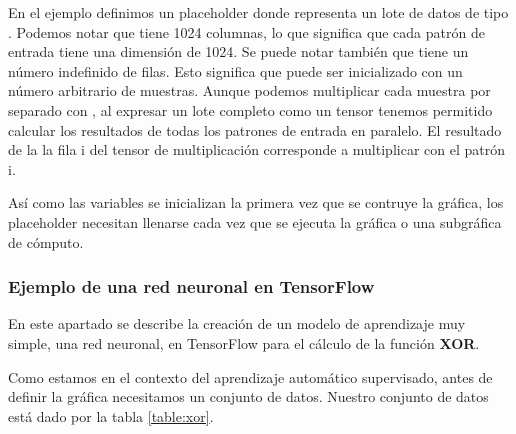 \begin{sphinxVerbatim}[commandchars=\\\{\}]
    \PYG{p}{[} \PYG{p}{]}
  \PYG{p}{[}\PYG{p}{]}   
   
\end{sphinxVerbatim}

En el ejemplo definimos un placeholder donde 
representa un lote de datos de tipo .
Podemos notar que  tiene 1024 columnas, lo
que significa que cada patrón de entrada
tiene una dimensión de 1024. Se puede notar también
que  tiene un número indefinido de filas.
Esto significa que  puede ser inicializado
con un número arbitrario de muestras. Aunque podemos
multiplicar cada muestra por separado con ,
al expresar un lote completo como un tensor tenemos
permitido calcular los resultados de todas los
patrones de entrada en paralelo. El
resultado de la la fila i del tensor de
multiplicación corresponde a multiplicar 
con el patrón i.

Así como las variables se inicializan la primera vez
que se contruye la gráfica, los placeholder necesitan
llenarse cada vez que se ejecuta la gráfica o una
subgráfica de cómputo.


\subsubsection{Ejemplo de una red neuronal en TensorFlow}

En este apartado se describe la creación de un modelo de aprendizaje muy
simple, una red neuronal, en TensorFlow para el cálculo de la función
\textbf{XOR}.


Como estamos en el contexto del aprendizaje automático
supervisado, antes de definir la gráfica necesitamos un conjunto de datos.
Nuestro conjunto de datos está dado por la tabla \ref{table:xor}.


